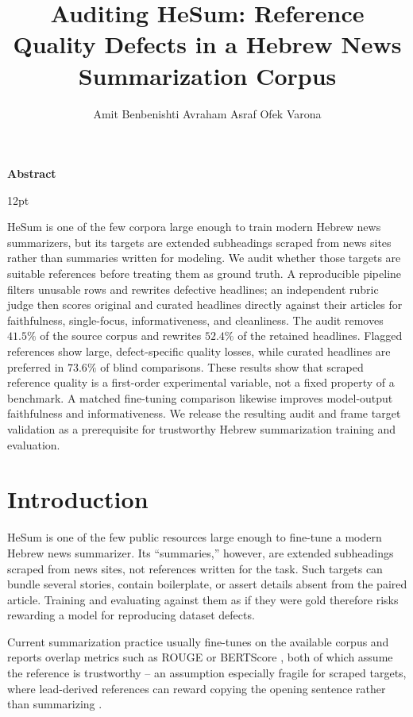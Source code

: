 \documentclass[11pt]{article}
\title{Auditing HeSum: Reference Quality Defects in a Hebrew News Summarization Corpus}
\author{
  Amit Benbenishti \And
  Avraham Asraf \And
  Ofek Varona
}
\makeatletter
\renewenvironment{abstract}%
    {\centerline{\large\bf Abstract}%
     \begin{list}{}%
        {\setlength{\rightmargin}{0.1cm}%
         \setlength{\leftmargin}{0.1cm}}%
      \item[]\ignorespaces%
      \@setsize\normalsize{12pt}\xpt\@xpt
      }%
    {\unskip\end{list}}
\makeatother
\begin{document}
\maketitle

\begin{abstract}
HeSum is one of the few corpora large enough to train modern Hebrew news summarizers, but its targets
are extended subheadings scraped from news sites rather than summaries written for modeling. We audit
whether those targets are suitable references before treating them as ground truth. A reproducible
pipeline filters unusable rows and rewrites defective headlines; an independent rubric judge then
scores original and curated headlines directly against their articles for faithfulness, single-focus,
informativeness, and cleanliness. The audit removes $41.5\%$ of the source corpus and rewrites $52.4\%$
of the retained headlines. Flagged references show large, defect-specific quality losses, while curated
headlines are preferred in $73.6\%$ of blind comparisons. These results show that scraped reference
quality is a first-order experimental variable, not a
fixed property of a benchmark. A matched fine-tuning comparison likewise improves model-output
faithfulness and informativeness. We release the resulting audit and frame target validation as a
prerequisite for trustworthy Hebrew summarization training and evaluation.
\end{abstract}

\section{Introduction}

HeSum \citep{paz-argaman2024hesum} is one of the few public resources large enough to fine-tune a
modern Hebrew news summarizer. Its ``summaries,'' however, are extended subheadings scraped from news
sites, not references written for the task. Such targets can bundle several stories, contain boilerplate,
or assert details absent from the paired article. Training and evaluating against them as if they were
gold therefore risks rewarding a model for reproducing dataset defects.

Current summarization practice usually fine-tunes on the available corpus and reports overlap metrics
such as ROUGE or BERTScore \citep{zhang2020bertscore}, both of which assume the reference is
trustworthy -- an assumption especially fragile for scraped targets, where lead-derived references can
reward copying the opening sentence rather than summarizing \citep{nallapati2016abstractive,see2017get}.
\end{document}

